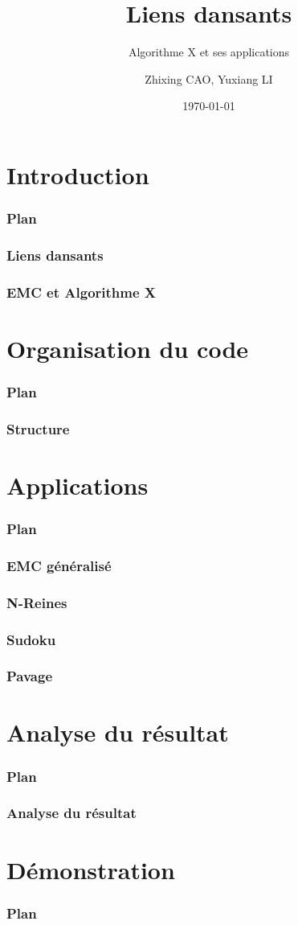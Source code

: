 \documentclass[12pt,t]{beamer}
\title{Liens dansants}
\subtitle{Algorithme X et ses applications}
\author{Zhixing CAO, Yuxiang LI}
\institute{INF\ 441}
\date[]{\today}
\begin{document}
\frame[plain]{\titlepage}

\section{Introduction}

\begin{frame}
\frametitle{Plan}
\tableofcontents[currentsection]
\end{frame}

\begin{frame}
\frametitle{Liens dansants}
\end{frame}

\begin{frame}
\frametitle{EMC et Algorithme X}
\end{frame}

\section{Organisation du code}

\begin{frame}
\frametitle{Plan}
\tableofcontents[currentsection]
\end{frame}

\begin{frame}
\frametitle{Structure}
\end{frame} 

\section{Applications}

\begin{frame}
\frametitle{Plan}
\tableofcontents[currentsection]
\end{frame}

\begin{frame}
\frametitle{EMC généralisé}
\end{frame}

\begin{frame}
\frametitle{N-Reines}
\end{frame}

\begin{frame}
\frametitle{Sudoku}
\end{frame}

\begin{frame}
\frametitle{Pavage}
\end{frame}

\section{Analyse du résultat}

\begin{frame}
\frametitle{Plan}
\tableofcontents[currentsection]
\end{frame}

\begin{frame}
\frametitle{Analyse du résultat}
\end{frame}

\section{Démonstration}

\begin{frame}
\frametitle{Plan}
\tableofcontents[currentsection]
\end{frame}
\end{document}
